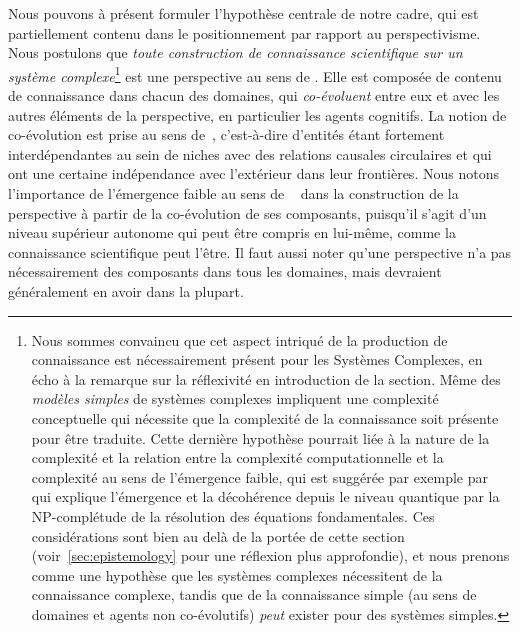 {Nous pouvons à présent formuler l'hypothèse centrale de notre cadre, qui est partiellement contenu dans le positionnement par rapport au perspectivisme. Nous postulons que \emph{toute construction de connaissance scientifique sur un système complexe}\footnote{Nous sommes convaincu que cet aspect intriqué de la production de connaissance est nécessairement présent pour les Systèmes Complexes, en écho à la remarque sur la réflexivité en introduction de la section. Même des \emph{modèles simples} de systèmes complexes impliquent une complexité conceptuelle qui nécessite que la complexité de la connaissance soit présente pour être traduite. Cette dernière hypothèse pourrait liée à la nature de la complexité et la relation entre la complexité computationnelle et la complexité au sens de l'émergence faible, qui est suggérée par exemple par~\cite{2014arXiv1403.7686B} qui explique l'émergence et la décohérence depuis le niveau quantique par la NP-complétude de la résolution des équations fondamentales. Ces considérations sont bien au delà de la portée de cette section (voir~\ref{sec:epistemology} pour une réflexion plus approfondie), et nous prenons comme une hypothèse que les systèmes complexes nécessitent de la connaissance complexe, tandis que de la connaissance simple (au sens de domaines et agents non co-évolutifs) \emph{peut} exister pour des systèmes simples.} est une perspective au sens de . Elle est composée de contenu de connaissance dans chacun des domaines, qui \emph{co-évoluent} entre eux et avec les autres éléments de la perspective, en particulier les agents cognitifs. La notion de co-évolution est prise au sens de~\cite{holland2012signals}, c'est-à-dire d'entités étant fortement interdépendantes au sein de niches avec des relations causales circulaires et qui ont une certaine indépendance avec l'extérieur dans leur frontières. Nous notons l'importance de l'émergence faible au sens de ~\cite{bedau2002downward} dans la construction de la perspective à partir de la co-évolution de ses composants, puisqu'il s'agit d'un niveau supérieur autonome qui peut être compris en lui-même, comme la connaissance scientifique peut l'être. Il faut aussi noter qu'une perspective n'a pas nécessairement des composants dans tous les domaines, mais devraient généralement en avoir dans la plupart.
}


